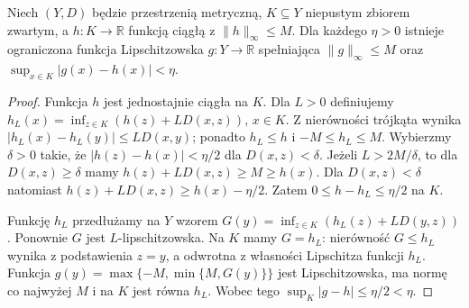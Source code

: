 \begin{lemat}
\label{lem:lipschitz-extend-22}
Niech $(Y,D)$ będzie przestrzenią metryczną, $K\subseteq Y$
niepustym zbiorem zwartym, a $h:K\to\mathbb R$ funkcją
ciągłą z $\|h\|_\infty\le M$. Dla każdego $\eta>0$
istnieje ograniczona funkcja Lipschitzowska
$g:Y\to\mathbb R$ spełniająca
$\|g\|_\infty\le M$ oraz
$\sup_{x\in K}|g(x)-h(x)|<\eta$.
\end{lemat}
\begin{proof}
Funkcja $h$ jest jednostajnie ciągła na $K$.
Dla $L>0$ definiujemy
$h_L(x)=\inf_{z\in K}(h(z)+L D(x,z))$, $x\in K$.
Z nierówności trójkąta wynika
$|h_L(x)-h_L(y)|\le L D(x,y)$; ponadto
$h_L\le h$ i $-M\le h_L\le M$.
Wybierzmy $\delta>0$ takie, że
$|h(z)-h(x)|<\eta/2$ dla $D(x,z)<\delta$.
Jeżeli $L>2M/\delta$, to dla $D(x,z)\ge\delta$
mamy $h(z)+LD(x,z)\ge M\ge h(x)$.
Dla $D(x,z)<\delta$ natomiast
$h(z)+LD(x,z)\ge h(x)-\eta/2$.
Zatem $0\le h-h_L\le\eta/2$ na $K$.

Funkcję $h_L$ przedłużamy na $Y$ wzorem
$G(y)=\inf_{z\in K}(h_L(z)+L D(y,z))$.
Ponownie $G$ jest $L$-lipschitzowska. Na $K$
mamy $G=h_L$: nierówność $G\le h_L$ wynika
z podstawienia $z=y$, a odwrotna z własności
Lipschitza funkcji $h_L$. Funkcja
$g(y)=\max\{-M,\min\{M,G(y)\}\}$ jest Lipschitzowska,
ma normę co najwyżej $M$ i na $K$ jest równa $h_L$.
Wobec tego $\sup_K|g-h|\le\eta/2<\eta$.
\end{proof}


